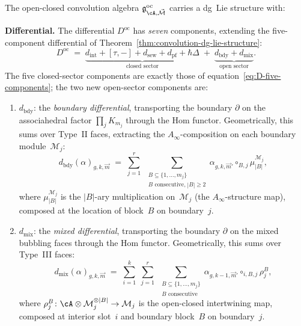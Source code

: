 \begin{theorem}
\label{thm:oc-convolution-dg-lie}
The open-closed convolution algebra
$\mathfrak{g}^{\mathrm{oc}}_{\cA, \vec{\mathcal{M}}}$ carries
a dg~Lie structure with:

\noindent\textbf{Differential.}
The differential $D^{\mathrm{oc}}$ has \emph{seven} components,
extending the five-component differential of
Theorem~\textup{\ref{thm:convolution-dg-lie-structure}}:
\begin{equation}\label{eq:Doc-seven}
D^{\mathrm{oc}}
\;=\;
\underbrace{d_{\mathrm{int}}
+ [\tau,-]
+ d_{\mathrm{sew}}
+ d_{\mathrm{pf}}
+ \hbar\Delta}_{\text{closed sector}}
\;+\;
\underbrace{d_{\mathrm{bdy}}
+ d_{\mathrm{mix}}}_{\text{open sector}}.
\end{equation}
The five closed-sector components are exactly those of
equation~\eqref{eq:D-five-components}; the two new open-sector
components are:
\begin{enumerate}[label=\textup{(\alph*)}]
\item $d_{\mathrm{bdy}}$: the \emph{boundary differential},
  transporting the boundary $\partial$ on the associahedral factor
  $\prod_j K_{m_j}$ through the Hom functor.  Geometrically, this
  sums over Type~II faces, extracting the $A_\infty$-composition
  on each boundary module~$\mathcal{M}_j$:
  \begin{equation}\label{eq:d-bdy}
  d_{\mathrm{bdy}}(\alpha)_{g, k, \vec{m}}
  \;=\;
  \sum_{j=1}^r \;
  \sum_{\substack{B \subseteq \{1, \ldots, m_j\} \\
  B \text{ consecutive,}\; |B| \geq 2}}
  \alpha_{g, k, \vec{m}'} \circ_{B,j}
  \mu_{|B|}^{\mathcal{M}_j},
  \end{equation}
  where $\mu_{|B|}^{\mathcal{M}_j}$ is the $|B|$-ary
  multiplication on~$\mathcal{M}_j$ (the $A_\infty$-structure
  map), composed at the location of block~$B$ on boundary~$j$.
\item $d_{\mathrm{mix}}$: the \emph{mixed differential},
  transporting the boundary $\partial$ on the mixed bubbling faces
  through the Hom functor.  Geometrically, this sums over
  Type~III faces:
  \begin{equation}\label{eq:d-mix}
  d_{\mathrm{mix}}(\alpha)_{g, k, \vec{m}}
  \;=\;
  \sum_{i=1}^{k}\;
  \sum_{j=1}^{r}\;
  \sum_{\substack{B \subseteq \{1,\ldots,m_j\} \\
  B \text{ consecutive}}}
  \alpha_{g, k-1, \vec{m}'} \circ_{i,B,j}
  \rho_j^B,
  \end{equation}
  where $\rho_j^B \colon \cA \otimes \mathcal{M}_j^{\otimes |B|}
  \to \mathcal{M}_j$ is the open-closed intertwining map, composed
  at interior slot~$i$ and boundary block~$B$ on boundary~$j$.
\end{enumerate}


\end{theorem}
